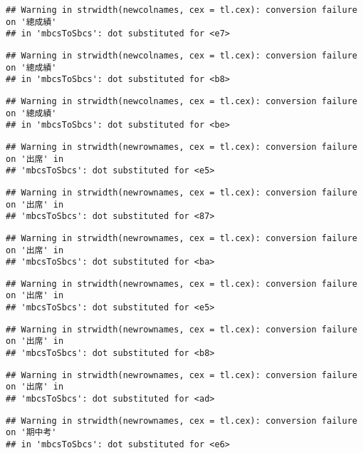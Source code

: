 \documentclass[
]{book}
\begin{document}
\begin{verbatim}
## Warning in strwidth(newcolnames, cex = tl.cex): conversion failure on '總成績'
## in 'mbcsToSbcs': dot substituted for <e7>
\end{verbatim}

\begin{verbatim}
## Warning in strwidth(newcolnames, cex = tl.cex): conversion failure on '總成績'
## in 'mbcsToSbcs': dot substituted for <b8>
\end{verbatim}

\begin{verbatim}
## Warning in strwidth(newcolnames, cex = tl.cex): conversion failure on '總成績'
## in 'mbcsToSbcs': dot substituted for <be>
\end{verbatim}

\begin{verbatim}
## Warning in strwidth(newrownames, cex = tl.cex): conversion failure on '出席' in
## 'mbcsToSbcs': dot substituted for <e5>
\end{verbatim}

\begin{verbatim}
## Warning in strwidth(newrownames, cex = tl.cex): conversion failure on '出席' in
## 'mbcsToSbcs': dot substituted for <87>
\end{verbatim}

\begin{verbatim}
## Warning in strwidth(newrownames, cex = tl.cex): conversion failure on '出席' in
## 'mbcsToSbcs': dot substituted for <ba>
\end{verbatim}

\begin{verbatim}
## Warning in strwidth(newrownames, cex = tl.cex): conversion failure on '出席' in
## 'mbcsToSbcs': dot substituted for <e5>
\end{verbatim}

\begin{verbatim}
## Warning in strwidth(newrownames, cex = tl.cex): conversion failure on '出席' in
## 'mbcsToSbcs': dot substituted for <b8>
\end{verbatim}

\begin{verbatim}
## Warning in strwidth(newrownames, cex = tl.cex): conversion failure on '出席' in
## 'mbcsToSbcs': dot substituted for <ad>
\end{verbatim}

\begin{verbatim}
## Warning in strwidth(newrownames, cex = tl.cex): conversion failure on '期中考'
## in 'mbcsToSbcs': dot substituted for <e6>
\end{verbatim}
\end{document}
